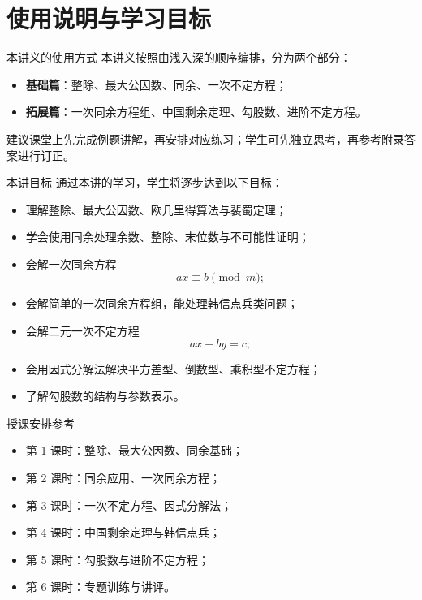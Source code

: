 \documentclass[11pt,a4paper,fontset=fandol]{ctexart}
\theoremstyle{formaltheorem}
\theoremstyle{formalexample}
\begin{document}
\pagestyle{plain}
\tableofcontents
\newpage
\pagestyle{fancy}

\section{使用说明与学习目标}

\begin{goalbox}{本讲义的使用方式}
本讲义按照由浅入深的顺序编排，分为两个部分：
\begin{itemize}
  \item \textbf{基础篇}：整除、最大公因数、同余、一次不定方程；
  \item \textbf{拓展篇}：一次同余方程组、中国剩余定理、勾股数、进阶不定方程。
\end{itemize}
建议课堂上先完成例题讲解，再安排对应练习；学生可先独立思考，再参考附录答案进行订正。
\end{goalbox}

\begin{goalbox}{本讲目标}
通过本讲的学习，学生将逐步达到以下目标：
\begin{itemize}
  \item 理解整除、最大公因数、欧几里得算法与裴蜀定理；
  \item 学会使用同余处理余数、整除、末位数与不可能性证明；
  \item 会解一次同余方程
  \[
  ax\equiv b\pmod m;
  \]
  \item 会解简单的一次同余方程组，能处理韩信点兵类问题；
  \item 会解二元一次不定方程
  \[
  ax+by=c;
  \]
  \item 会用因式分解法解决平方差型、倒数型、乘积型不定方程；
  \item 了解勾股数的结构与参数表示。
\end{itemize}
\end{goalbox}

\begin{notebox}{授课安排参考}
\begin{itemize}
  \item 第 1 课时：整除、最大公因数、同余基础；
  \item 第 2 课时：同余应用、一次同余方程；
  \item 第 3 课时：一次不定方程、因式分解法；
  \item 第 4 课时：中国剩余定理与韩信点兵；
  \item 第 5 课时：勾股数与进阶不定方程；
  \item 第 6 课时：专题训练与讲评。
\end{itemize}
\end{notebox}
\end{document}
